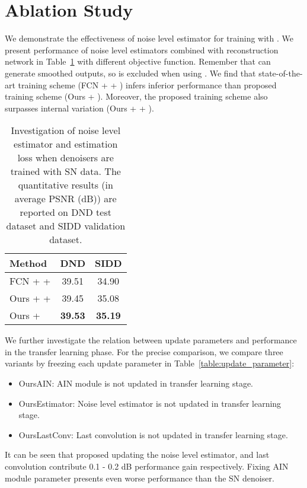 \documentclass[10pt,twocolumn,letterpaper]{article}
\begin{document}
\section{Ablation Study}
We demonstrate the effectiveness of noise level estimator for training with .
We present performance of noise level estimators combined with reconstruction network in Table~\ref{table:combined_estimator} with different objective function.
Remember that  can generate smoothed outputs, so  is excluded when using .
We find that state-of-the-art training scheme (FCN +  + ) infers inferior performance than proposed training scheme (Ours + ).  
Moreover, the proposed training scheme also surpasses internal variation (Ours +  + ). 

\begin{table}[h]
	\centering
	\caption{Investigation of noise level estimator and estimation loss when denoisers are trained with SN data. The quantitative results (in average PSNR (dB)) are reported on DND test dataset and SIDD validation dataset.}
	\label{table:combined_estimator}
	\begin{adjustbox}{width=0.6\linewidth}
		\begin{tabular}{lcc}
			\toprule
			Method   & DND & SIDD \\
			\midrule
			FCN +  +     & 39.51 & 34.90 \\		
			Ours +  +     & 39.45 & 35.08 \\
			Ours +  & \textbf{39.53} & \textbf{35.19} \\ 		
			\bottomrule			
		\end{tabular}
	\end{adjustbox}
\end{table}

We further investigate the relation between update parameters and performance in the transfer learning phase.
For the precise comparison, we compare three variants by freezing each update parameter in Table~\ref{table:update_parameter}:
\begin{itemize}
	\item Ours\text{-}AIN: AIN module is not updated in transfer learning stage.	
	\item Ours\text{-}Estimator: Noise level estimator is not updated in transfer learning stage.
	\item Ours\text{-}LastConv: Last convolution is not updated in transfer learning stage.	
\end{itemize}
It can be seen that proposed updating the noise level estimator, and last convolution contribute 0.1 - 0.2 dB performance gain respectively. Fixing AIN module parameter presents even worse performance than the SN denoiser.
\end{document}
